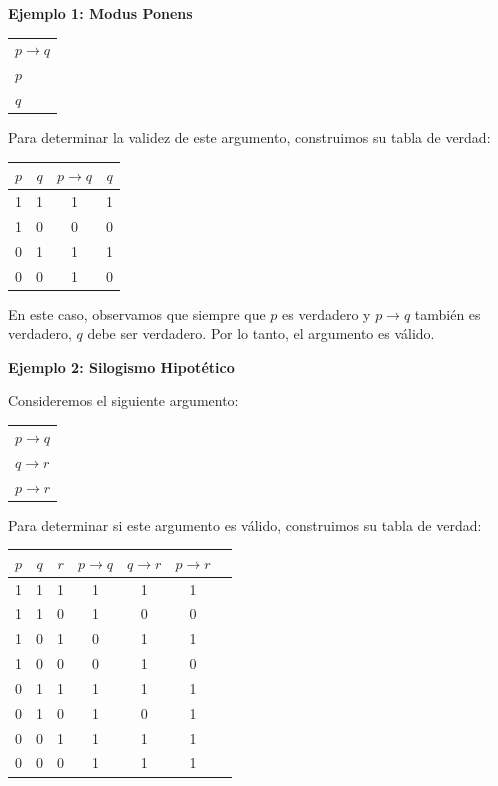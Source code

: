 \bigskip

\textbf{Ejemplo 1: Modus Ponens}  

\begin{center}
\begin{tabular}{l}
$p \rightarrow q$ \\
$p$ \\
\hline
$q$
\end{tabular}
\end{center}

Para determinar la validez de este argumento, construimos su tabla de verdad:

\begin{center}
\begin{tabular}{|c|c|c|c|}
\hline
$p$ & $q$ & $p \rightarrow q$ & $q$ \\
\hline
1 & 1 & 1 & 1 \\
1 & 0 & 0 & 0 \\
0 & 1 & 1 & 1 \\
0 & 0 & 1 & 0 \\
\hline
\end{tabular}
\end{center}

En este caso, observamos que siempre que \( p \) es verdadero y \( p \rightarrow q \) también es verdadero, \( q \) debe ser verdadero. Por lo tanto, el argumento es válido.


\bigskip  

\textbf{Ejemplo 2: Silogismo Hipotético}  

Consideremos el siguiente argumento:

\begin{center}
\begin{tabular}{l}
$p \rightarrow q$ \\
$q \rightarrow r$ \\
\hline
$p \rightarrow r$
\end{tabular}
\end{center}

Para determinar si este argumento es válido, construimos su tabla de verdad:

\begin{center}
\begin{tabular}{|c|c|c|c|c|c|c|}
\hline
$p$ & $q$ & $r$ & $p \rightarrow q$ & $q \rightarrow r$ & $p \rightarrow r$ \\
\hline
1 & 1 & 1 & 1 & 1 & 1 \\
1 & 1 & 0 & 1 & 0 & 0 \\
1 & 0 & 1 & 0 & 1 & 1 \\
1 & 0 & 0 & 0 & 1 & 0 \\
0 & 1 & 1 & 1 & 1 & 1 \\
0 & 1 & 0 & 1 & 0 & 1 \\
0 & 0 & 1 & 1 & 1 & 1 \\
0 & 0 & 0 & 1 & 1 & 1 \\
\hline
\end{tabular}
\end{center}


